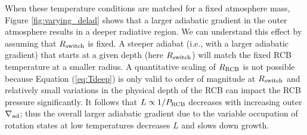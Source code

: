When these temperature conditions are matched for a fixed atmosphere mass, Figure \ref{fig:varying_delad} shows that a larger adiabatic gradient in the outer atmosphere results in a deeper radiative region. We can understand this effect by assuming that $R_{\rm switch}$ is fixed. A steeper adiabat (i.e., with a larger adiabatic gradient) that starts at a given depth (here $R_{\rm switch}$) will match the fixed RCB temperature at a smaller radius. A quantitative scaling of $R_{\rm RCB}$ is not possible because Equation (\ref{eq:Tdeep})  is only valid to order of magnitude at $R_{\rm switch}$ and relatively small variations in the physical depth of the RCB can impact the RCB pressure significantly. It follows that $L \propto 1/P_{\rm RCB}$ decreases with increasing outer $\nabla_{\rm ad}$; thus the overall larger adiabatic gradient due to the variable occupation of rotation states at low temperatures decreases $L$ and slows down growth. 





